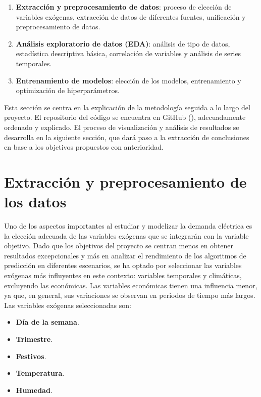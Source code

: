 \documentclass[12pt,a4paper]{report}
\begin{document}
\begin{enumerate}
    \item \textbf{Extracción y preprocesamiento de datos}: proceso de elección de variables exógenas, extracción de datos de diferentes fuentes, unificación y preprocesamiento de datos.

    \item \textbf{Análisis exploratorio de datos (EDA)}: análisis de tipo de datos, estadística descriptiva básica, correlación de variables y análisis de series temporales.

    \item \textbf{Entrenamiento de modelos}: elección de los modelos, entrenamiento y optimización de hiperparámetros.
\end{enumerate}

Esta sección se centra en la explicación de la metodología seguida a lo largo del proyecto. El repositorio del código se encuentra en GitHub (\cite{gregorio}), adecuadamente ordenado y explicado. El proceso de visualización y análisis de resultados se desarrolla en la siguiente sección, que dará paso a la extracción de conclusiones en base a los objetivos propuestos con anterioridad.

\section{Extracción y preprocesamiento de los datos}

Uno de los aspectos importantes al estudiar y modelizar la demanda eléctrica es la elección adecuada de las variables exógenas que se integrarán con la variable objetivo. Dado que los objetivos del proyecto se centran menos en obtener resultados excepcionales y más en analizar el rendimiento de los algoritmos de predicción en diferentes escenarios, se ha optado por seleccionar las variables exógenas más influyentes en este contexto: variables temporales y climáticas, excluyendo las económicas. Las variables económicas tienen una influencia menor, ya que, en general, sus variaciones se observan en periodos de tiempo más largos. Las variables exógenas seleccionadas son:

\begin{itemize}
    \item \textbf{Día de la semana}.

    \item \textbf{Trimestre}.

    \item \textbf{Festivos}.

    \item \textbf{Temperatura}.

    \item \textbf{Humedad}.
\end{itemize}
\end{document}
